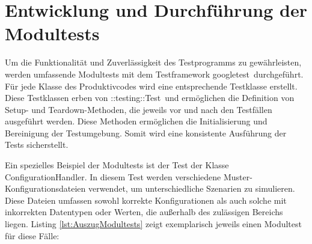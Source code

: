 \section{Entwicklung und Durchführung der Modultests}

Um die Funktionalität und Zuverlässigkeit des Testprogramms zu gewährleisten, werden umfassende Modultests mit dem Testframework \glqq googletest\grqq\ durchgeführt. Für jede Klasse des 
Produktivcodes wird eine entsprechende Testklasse erstellt. Diese Testklassen erben von \glqq ::testing::Test\grqq\ und ermöglichen die Definition von Setup- und Teardown-Methoden, 
die jeweils vor und nach den Testfällen ausgeführt werden. Diese Methoden ermöglichen die Initialisierung und Bereinigung der Testumgebung. Somit wird eine konsistente Ausführung 
der Tests sicherstellt.

Ein spezielles Beispiel der Modultests ist der Test der Klasse \glqq ConfigurationHandler\grqq. In diesem Test werden verschiedene Muster-Konfigurationsdateien verwendet, um 
unterschiedliche Szenarien zu simulieren. Diese Dateien umfassen sowohl korrekte Konfigurationen als auch solche mit inkorrekten Datentypen oder Werten, die außerhalb des zulässigen 
Bereichs liegen. Listing \ref{lst:AuszugModultests} zeigt exemplarisch jeweils einen Modultest für diese Fälle:

\vspace{12pt}

